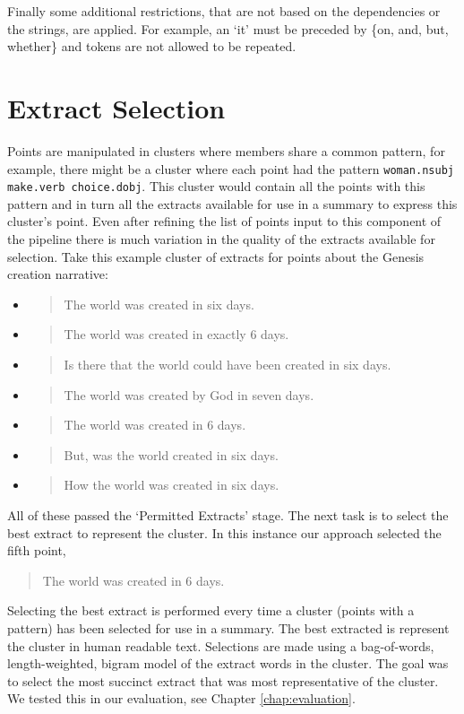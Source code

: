     Finally some additional restrictions, that are not based on the dependencies or the strings, are applied. For example, an `it' must be preceded by \{on, and, but, whether\} and tokens are not allowed to be repeated.

  \section{Extract Selection}
    Points are manipulated in clusters where members share a common pattern, for example, there might be a cluster where each point had the pattern \texttt{woman.nsubj make.verb choice.dobj}. This cluster would contain all the points with this pattern and in turn all the extracts available for use in a summary to express this cluster's point. Even after refining the list of points input to this component of the pipeline there is much variation in the quality of the extracts available for selection. Take this example cluster of extracts for points about the Genesis creation narrative:

    \begin{itemize}[label={}]
      \item{\blockquote{The world was created in six days.}}
      \item{\blockquote{The world was created in exactly 6 days.}}
      \item{\blockquote{Is there that the world could have been created in six days.}}
      \item{\blockquote{The world was created by God in seven days.}}
      \item{\blockquote{The world was created in 6 days.}}
      \item{\blockquote{But, was the world created in six days.}}
      \item{\blockquote{How the world was created in six days.}}
    \end{itemize}

    All of these passed the `Permitted Extracts' stage. The next task is to select the best extract to represent the cluster. In this instance our approach selected the fifth point, \blockquote{The world was created in 6 days.}. Selecting the best extract is performed every time a cluster (points with a pattern) has been selected for use in a summary. The best extracted is represent the cluster in human readable text. Selections are made using a bag-of-words, length-weighted, bigram model of the extract words in the cluster. The goal was to select the most succinct extract that was most representative of the cluster. We tested this in our evaluation, see Chapter \ref{chap:evaluation}.

